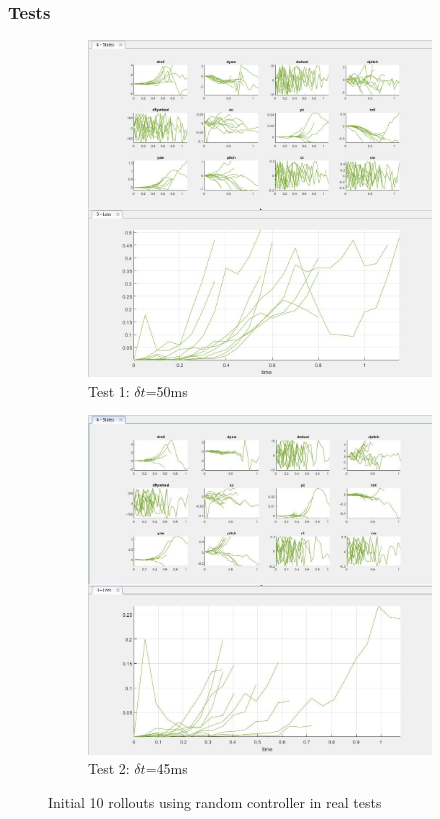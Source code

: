 \documentclass[twoside,twocolumn,12pt]{article}
\begin{document}
\twocolumn
\subsubsection{Tests}
\begin{figure}[t]
  \centering
  \begin{subfigure}[t]{0.49\textwidth}
  \centering
    \includegraphics[width=\linewidth]{1-0}
   \caption{Test 1: $\delta t$=50ms}
  \label{fig:t1}
  \end{subfigure}
  \begin{subfigure}[t]{0.49\textwidth}
  \centering
    \includegraphics[width=\linewidth]{2-0}
    \caption{Test 2: $\delta t$=45ms}
  \label{fig:t2}
  \end{subfigure}
  \caption{Initial 10 rollouts using random controller in real tests}
  \label{fig:init}
\end{figure}
\end{document}

